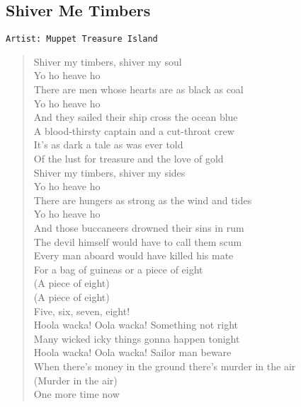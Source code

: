 \documentclass[11pt]{article}
\begin{document}
\subsection{Shiver Me Timbers}
\label{sec:orga5478ce}
\begin{verbatim}
Artist: Muppet Treasure Island
\end{verbatim}
\begin{verse}
Shiver my timbers, shiver my soul\\
Yo ho heave ho\\
There are men whose hearts are as black as coal\\
Yo ho heave ho\\
\vspace*{1em}
And they sailed their ship cross the ocean blue\\
A blood-thirsty captain and a cut-throat crew\\
It's as dark a tale as was ever told\\
Of the lust for treasure and the love of gold\\
\vspace*{1em}
Shiver my timbers, shiver my sides\\
Yo ho heave ho\\
There are hungers as strong as the wind and tides\\
Yo ho heave ho\\
And those buccaneers drowned their sins in rum\\
The devil himself would have to call them scum\\
Every man aboard would have killed his mate\\
For a bag of guineas or a piece of eight\\
(A piece of eight)\\
(A piece of eight)\\
\vspace*{1em}
Five, six, seven, eight!\\
\vspace*{1em}
Hoola wacka! Oola wacka! Something not right\\
Many wicked icky things gonna happen tonight\\
Hoola wacka! Oola wacka! Sailor man beware\\
When there's money in the ground there's murder in the air\\
(Murder in the air)\\
\vspace*{1em}
One more time now\\

\end{verse}
\end{document}
